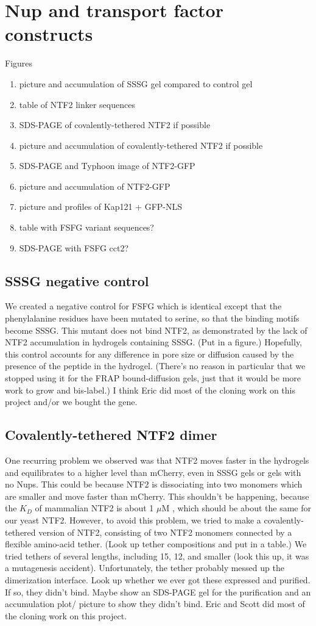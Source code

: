 \section{Nup and transport factor constructs}
Figures
\begin{enumerate}
\item picture and accumulation of SSSG gel compared to control gel
\item table of NTF2 linker sequences
\item SDS-PAGE of covalently-tethered NTF2 if possible
\item picture and accumulation of covalently-tethered NTF2 if possible
\item SDS-PAGE and Typhoon image of NTF2-GFP
\item picture and accumulation of NTF2-GFP
\item picture and profiles of Kap121 + GFP-NLS
\item table with FSFG variant sequences?
\item SDS-PAGE with FSFG cct2?
\end{enumerate}
\subsection{SSSG negative control}
We created a negative control for FSFG which is identical except that the phenylalanine residues have been mutated to serine, so that the binding motifs become SSSG.  This mutant does not bind NTF2, as demonstrated by the lack of NTF2 accumulation in hydrogels containing SSSG. (Put in a figure.) Hopefully, this control accounts for any difference in pore size or diffusion caused by the presence of the peptide in the hydrogel.  (There's no reason in particular that we stopped using it for the FRAP bound-diffusion gels, just that it would be more work to grow and bis-label.) I think Eric did most of the cloning work on this project and/or we bought the gene.
\subsection{Covalently-tethered NTF2 dimer}
One recurring problem we observed was that NTF2 moves faster in the hydrogels and equilibrates to a higher level than mCherry, even in SSSG gels or gels with no Nups.  This could be because NTF2 is dissociating into two monomers which are smaller and move faster than mCherry.  This shouldn't be happening, because the $K_D$ of mammalian NTF2 is about 1 $\mu$M \cite{chaillan-huntington01}, which should be about the same for our yeast NTF2.  However, to avoid this problem, we tried to make a covalently-tethered version of NTF2, consisting of two NTF2 monomers connected by a flexible amino-acid tether.  (Look up tether compositions and put in a table.)  We tried tethers of several lengths, including 15, 12, and smaller (look this up, it was a mutagenesis accident).  Unfortunately, the tether probably messed up the dimerization interface.  Look up whether we ever got these expressed and purified.  If so, they didn't bind.  Maybe show an SDS-PAGE gel for the purification and an accumulation plot/ picture to show they didn't bind. Eric and Scott did most of the cloning work on this project.
